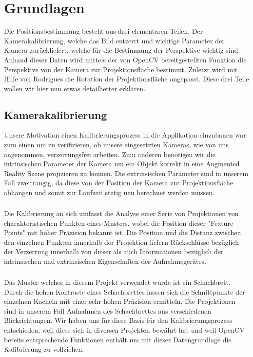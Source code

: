 \chapter{Grundlagen}

Die Positionsbestimmung besteht aus drei elementaren Teilen. Der Kamerakalibrierung, welche das Bild entzerrt und wichtige Parameter der Kamera zurückliefert, welche für die Bestimmung der Perspektive wichtig sind. Anhand dieser Daten wird mittels der von OpenCV bereitgestellten Funktion die Perspektive von der Kamera zur Projektionsfläche bestimmt. Zuletzt wird mit Hilfe von Rodrigues die Rotation der Projektionsfläche angepasst. Diese drei Teile wollen wir hier nun etwas detaillierter erklären.

\section{Kamerakalibrierung}
Unsere Motivation einen Kalibrierungsprozess in die Applikation einzubauen war zum einen um zu verifizieren, ob unsere eingesetzten Kameras, wie von uns angenommen, verzerrungsfrei arbeiten. Zum anderen benötigen wir die intrinsischen Parameter der Kamera um ein Objekt korrekt in eine Augmented Reality Szene projizieren zu können. Die extrinsischen Parameter sind in unserem Fall zweitrangig, da diese von der Position der Kamera zur Projektionsfläche abhängen und somit zur Laufzeit stetig neu berechnet werden müssen.
\paragraph{}
Die Kalibrierung an sich umfasst die Analyse einer Serie von Projektionen von charakteristischen Punkten eines Musters, wobei die Position dieser "Feature Points" mit hoher Präzision bekannt ist. Die Position und die Distanz zwischen den einzelnen Punkten innerhalb der Projektion liefern Rückschlüsse bezüglich der Verzerrung innerhalb von dieser als auch Informationen bezüglich der intrinsischen und extrinsischen Eigenschaften des Aufnahmegerätes. 
\paragraph{}
Das Muster welches in diesem Projekt verwendet wurde ist ein Schachbrett. Durch die hohen Kontraste eines Schachbrettes lassen sich die Schnittpunkte der einzelnen Kacheln mit einer sehr hohen Präzision ermitteln. Die Projektionen sind in unserem Fall Aufnahmen des Schachbrettes aus verschiedenen Blickrichtungen. Wir haben uns für diese Basis für den Kalibrierungsprozess entschieden, weil diese sich in diversen Projekten bewährt hat und weil OpenCV bereits entsprechende Funktionen enthält um mit dieser Datengrundlage die Kalibrierung zu vollziehen. 

